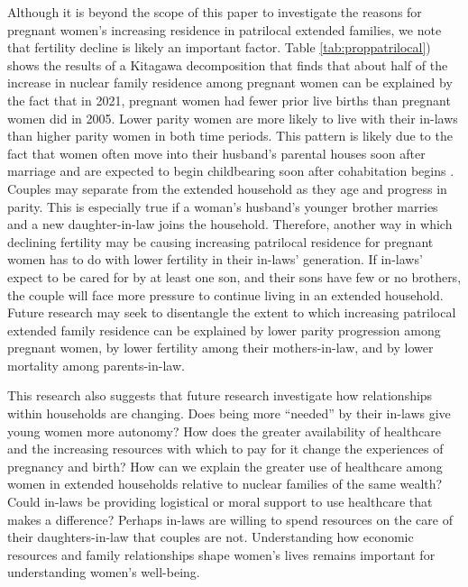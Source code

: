 \documentclass[12pt]{article}
\begin{document}
Although it is beyond the scope of this paper to investigate the reasons for pregnant women's increasing residence in patrilocal extended families, we note that fertility decline is likely an important factor.  Table \ref{tab:proppatrilocal}) shows the results of a Kitagawa decomposition that finds that about half of the increase in nuclear family residence among pregnant women can be explained by the fact that in 2021, pregnant women had fewer prior live births than pregnant women did in 2005.  Lower parity women are more likely to live with their in-laws than higher parity women in both time periods.  This pattern is likely due to the fact that women often move into their husband's parental houses soon after marriage \cite{breton2021modernisation} and are expected to begin childbearing soon after cohabitation begins \cite{ibarra2020desire}. Couples may separate from the extended household as they age and progress in parity. This is especially true if a woman's husband's younger brother marries and a new daughter-in-law joins the household.  Therefore, another way in which declining fertility may be causing increasing patrilocal residence for pregnant women has to do with lower fertility in their in-laws' generation.  If in-laws' expect to be cared for by at least one son, and their sons have few or no brothers, the couple will face more pressure to continue living in an extended household.  Future research may seek to disentangle the extent to which increasing patrilocal extended family residence can be explained by lower parity progression among pregnant women, by lower fertility among their mothers-in-law, and by lower mortality among parents-in-law. 

This research also suggests that future research investigate how relationships within households are changing. Does being more ``needed'' by their in-laws give young women more autonomy?  How does the greater availability of healthcare and the increasing resources with which to pay for it change the experiences of pregnancy and birth?  How can we explain the greater use of healthcare among women in extended households relative to nuclear families of the same wealth?  Could in-laws be providing logistical or moral support to use healthcare that makes a difference?  Perhaps in-laws are willing to spend resources on the care of their daughters-in-law that couples are not.  Understanding how economic resources and family relationships shape women's lives remains important for understanding women's well-being. 
\end{document}
